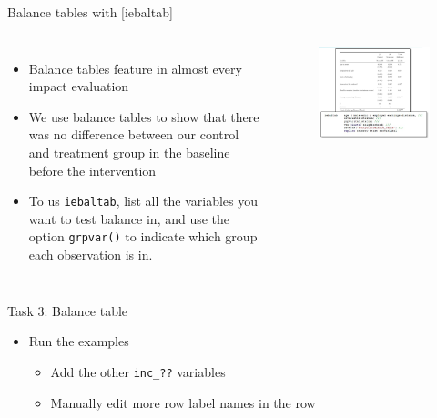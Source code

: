\documentclass[aspectratio=169]{beamer}
\begin{document}
\begin{frame}[fragile]{Balance tables with [iebaltab]}
	\begin{columns}[c]
		\begin{itemize}
			\item Balance tables feature in almost every impact evaluation
			\item We use balance tables to show that there was no difference between our control and treatment group in the baseline before the intervention
			\item To us \texttt{iebaltab}, list all the variables you want to test balance in, and use the option \texttt{grpvar()} to indicate which group each observation is in. 
		\end{itemize}
		\begin{figure}
			\centering
			\includegraphics[width=\linewidth]{img/iedbaltab}
		\end{figure}
	\end{columns}
\end{frame}


\begin{frame}{Task 3: Balance table}
	\begin{itemize}
		\item Run the examples
		\begin{itemize}
			\item Add the other \texttt{inc\_??} variables
			\item Manually edit more row label names in the row
		\end{itemize}
	\end{itemize}
\end{frame}
\end{document}
